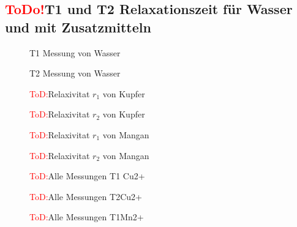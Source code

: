\subsection{\textcolor{red}{ToDo!}T1 und T2 Relaxationszeit für Wasser und mit Zusatzmitteln}
 

\begin{figure}[H]
    \centering
    
    \caption{T1 Messung von Wasser}
\end{figure}

\begin{figure}[H]
    \centering
    
    \caption{T2 Messung von Wasser}
\end{figure}

\begin{figure}[H]
    \centering
    
    \caption{\textcolor{red}{ToD:}Relaxivitat $r_1$ von Kupfer}
    \label{fig:RelaxCUT1}
\end{figure}

\begin{figure}[H]
    \centering
    
    \caption{\textcolor{red}{ToD:}Relaxivitat $r_2$ von Kupfer}
    \label{fig:RelaxCUT2}
\end{figure}

\begin{figure}[H]
    \centering
    
    \caption{\textcolor{red}{ToD:}Relaxivitat $r_1$ von Mangan}
    \label{fig:RelaxMNT1}
\end{figure}

\begin{figure}[H]
    \centering
    
    \caption{\textcolor{red}{ToD:}Relaxivitat $r_2$ von Mangan}
    \label{fig:RelaxMNT2}
\end{figure}

\begin{figure}[H]
    \centering
    
    \caption{\textcolor{red}{ToD:}Alle Messungen T1 Cu2+}
    \label{fig:T1CU}
\end{figure}

\begin{figure}[H]
    \centering
    
    \caption{\textcolor{red}{ToD:}Alle Messungen T2Cu2+}
    \label{fig:T2CU}
\end{figure}

\begin{figure}[H]
    \centering
    
    \caption{\textcolor{red}{ToD:}Alle Messungen T1Mn2+}
    \label{fig:T1Mn}
\end{figure}

